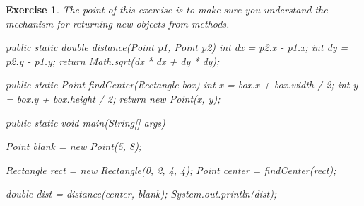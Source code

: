 \documentclass[12pt]{book}
\theoremstyle{exercise}
\newtheorem{exercise}{Exercise}[chapter]
\newcommand{\java}{\verb}%}
\begin{document}
\begin{exercise}
The point of this exercise is to make sure you understand the mechanism for returning new objects from methods.


\begin{code}
public static double distance(Point p1, Point p2) {
    int dx = p2.x - p1.x;
    int dy = p2.y - p1.y;
    return Math.sqrt(dx * dx + dy * dy);
}

public static Point findCenter(Rectangle box) {
    int x = box.x + box.width / 2;
    int y = box.y + box.height / 2;
    return new Point(x, y);
}
\end{code}

\begin{code}
public static void main(String[] args) {
    Point blank = new Point(5, 8);

    Rectangle rect = new Rectangle(0, 2, 4, 4);
    Point center = findCenter(rect);

    double dist = distance(center, blank);
    System.out.println(dist);
}
\end{code}

\end{exercise}
\end{document}
